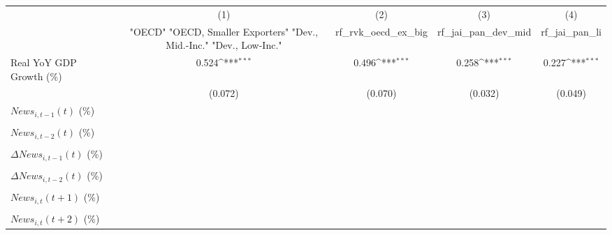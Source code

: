 {
\def\sym#1{\ifmmode^{#1}\else\(^{#1}\)\fi}
\begin{tabular}{l*{4}{c}}
\toprule
                    &\multicolumn{1}{c}{(1)}&\multicolumn{1}{c}{(2)}&\multicolumn{1}{c}{(3)}&\multicolumn{1}{c}{(4)}\\
                    &\multicolumn{1}{c}{ "OECD" "OECD, Smaller Exporters" "Dev., Mid.-Inc." "Dev., Low-Inc."}&\multicolumn{1}{c}{rf_rvk_oecd_ex_big}&\multicolumn{1}{c}{rf_jai_pan_dev_mid}&\multicolumn{1}{c}{rf_jai_pan_li}\\
\midrule
Real YoY GDP Growth (\%)&       0.524\sym{***}&       0.496\sym{***}&       0.258\sym{***}&       0.227\sym{***}\\
                    &     (0.072)         &     (0.070)         &     (0.032)         &     (0.049)         \\
\addlinespace
$ News_{i,t-1}(t)$ (\%)&                     &                     &                     &                     \\
                    &                     &                     &                     &                     \\
\addlinespace
$ News_{i,t-2}(t)$ (\%)&                     &                     &                     &                     \\
                    &                     &                     &                     &                     \\
\addlinespace
$ \Delta News_{i,t-1}(t)$ (\%)&                     &                     &                     &                     \\
                    &                     &                     &                     &                     \\
\addlinespace
$ \Delta News_{i,t-2}(t)$ (\%)&                     &                     &                     &                     \\
                    &                     &                     &                     &                     \\
\addlinespace
$ News_{i,t}(t+1)$ (\%)&                     &                     &                     &                     \\
                    &                     &                     &                     &                     \\
\addlinespace
$ News_{i,t}(t+2)$ (\%)&                     &                     &                     &                     \\

\end{tabular}}
